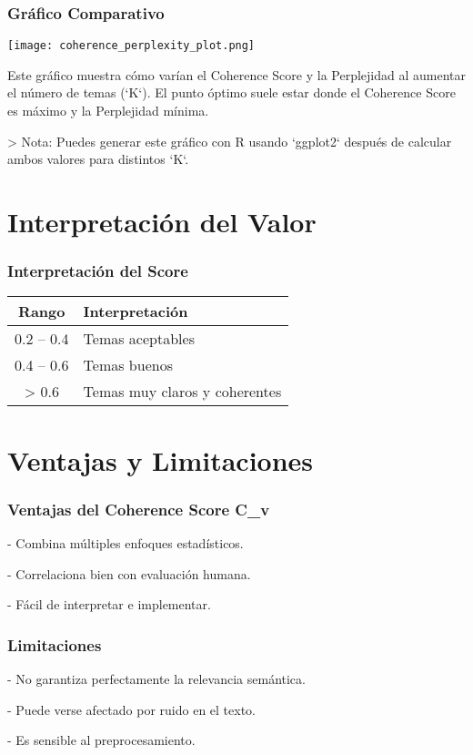 \documentclass[10pt]{beamer}
\begin{document}
\begin{frame}
\frametitle{Gráfico Comparativo}
\begin{center}
\texttt{[image: coherence\_perplexity\_plot.png]}
\end{center}

Este gráfico muestra cómo varían el Coherence Score y la Perplejidad al aumentar el número de temas (`K`). El punto óptimo suele estar donde el Coherence Score es máximo y la Perplejidad mínima.

> Nota: Puedes generar este gráfico con R usando `ggplot2` después de calcular ambos valores para distintos `K`.
\end{frame}

\section{Interpretación del Valor}
\begin{frame}
\frametitle{Interpretación del Score}
\begin{center}
\begin{tabular}{cl}
\toprule
Rango & Interpretación \\
\midrule
0.2 – 0.4 & Temas aceptables \\
0.4 – 0.6 & Temas buenos \\
> 0.6     & Temas muy claros y coherentes \\
\bottomrule
\end{tabular}
\end{center}
\end{frame}

\section{Ventajas y Limitaciones}
\begin{frame}
\frametitle{Ventajas del Coherence Score C_v}

    
- Combina múltiples enfoques estadísticos.
    
- Correlaciona bien con evaluación humana.
    
- Fácil de interpretar e implementar.

\end{frame}

\begin{frame}
\frametitle{Limitaciones}

    
- No garantiza perfectamente la relevancia semántica.
    
- Puede verse afectado por ruido en el texto.
    
- Es sensible al preprocesamiento.

\end{frame}
\end{document}
